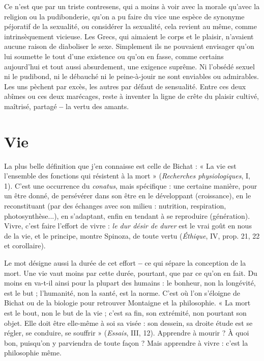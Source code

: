 Ce n’est que par un triste contresens, qui a moins à voir avec la morale
qu'avec la religion ou la pudibonderie, qu’on a pu faire du vice une espèce de
synonyme péjoratif de la sexualité, ou considérer la sexualité, cela revient au
même, comme intrinsèquement vicieuse. Les Grecs, qui aimaient le corps et
le plaisir, n’avaient aucune raison de diaboliser le sexe. Simplement ils ne
pouvaient envisager qu’on lui soumette le tout d’une existence ou qu’on en
fasse, comme certains aujourd’hui et tout aussi absurdement, une exigence
suprême. Ni l’obsédé sexuel ni le pudibond, ni le débauché ni le peine-à-jouir
ne sont enviables ou admirables. Les uns pèchent par excès, les autres par
défaut de sensualité. Entre ces deux abîmes ou ces deux marécages, reste à
inventer la ligne de crête du plaisir cultivé, maîtrisé, partagé {\bf --} la vertu des
amants.

\section{Vie}
La plus belle définition que j'en connaisse est celle de Bichat : « La vie
est l’ensemble des fonctions qui résistent à la mort » ({\it Recherches physiologiques},
I, 1). C’est une occurrence du {\it conatus}, mais spécifique : une certaine
manière, pour un être donné, de persévérer dans son être en le développant
(croissance), en le reconstituant (par des échanges avec son milieu : nutrition,
respiration, photosynthèse...), en s’adaptant, enfin en tendant à se reproduire
(génération). Vivre, c’est faire l’effort de vivre : {\it le dur désir de durer} est le vrai
goût en nous de la vie, et le principe, montre Spinoza, de toute vertu ({\it Éthique},
IV, prop. 21, 22 et corollaire).

Le mot désigne aussi la durée de cet effort {\bf --} ce qui sépare la conception de
la mort. Une vie vaut moins par cette durée, pourtant, que par ce qu’on en fait.
Du moins en va-t-il ainsi pour la plupart des humains : le bonheur, non la longévité,
est le but ; l'humanité, non la santé, est la norme. C’est où l’on s'éloigne
de Bichat ou de la biologie pour retrouver Montaigne et la philosophie. « La
mort est le bout, non le but de la vie ; c’est sa fin, son extrémité, non pourtant
son objet. Elle doit être elle-même à soi sa visée : son dessein, sa droite étude
est se régler, se conduire, se souffrir » ({\it Essais}, III, 12). Apprendre à mourir ? À
quoi bon, puisqu'on y parviendra de toute façon ? Mais apprendre à vivre :
c’est la philosophie même.

